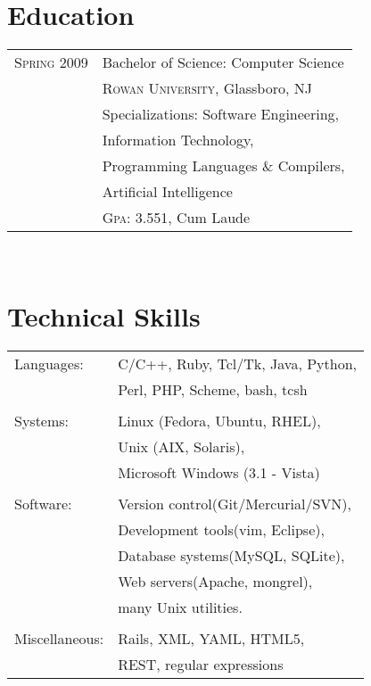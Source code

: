\documentclass[10pt]{article}
\begin{document}
	\par{\centering
		{\sffamily\Huge {}
	}
	\par \hfill
	\par \hfill


\begin{minipage}[t]{0.44\textwidth} %
	
	\vspace{0pt} %
	

	

\section{Education}

\begin{tabular}{rl}
 	
	\textsc{Spring} 2009 & Bachelor of Science: Computer Science\\
	 & \textsc{Rowan University}, Glassboro, NJ\\
	 & Specializations: Software Engineering,\\
	 & Information Technology,\\
	 & Programming Languages \& Compilers,\\
	 & Artificial Intelligence\\
	 &\normalsize \textsc{Gpa}: 3.551, Cum Laude

\end{tabular}\\

\section{Technical Skills} 

    \begin{tabular}{ll}
		Languages:	       & C/C++, Ruby, Tcl/Tk, Java, Python,\\
		                   & Perl, PHP, Scheme, bash, tcsh \\
		                   & \\
	    Systems: & Linux (Fedora, Ubuntu, RHEL), \\
	                       & Unix (AIX, Solaris), \\
	                       & Microsoft Windows (3.1 - Vista) \\
	                       & \\
	    Software:          & Version control(Git/Mercurial/SVN),\\
	                       & Development tools(vim, Eclipse), \\
	                       & Database systems(MySQL, SQLite), \\
	                       & Web servers(Apache, mongrel), \\
	                       & many Unix utilities. \\
	                       & \\
	    Miscellaneous:     & Rails, XML, YAML, HTML5, \\
	                       & REST, regular expressions
	\end{tabular}
	


\end{minipage}}
\end{document}
